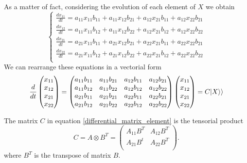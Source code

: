 As a matter of fact, considering the evolution of each element of $X$ we obtain
\begin{equation}
    \left\{\begin{aligned}
        \frac{dx_{11}}{dt} = a_{11}x_{11}b_{11} +a_{11}x_{12}b_{21}+ a_{12}x_{21}b_{11}+ a_{12}x_{22}b_{21}\\
        \frac{dx_{12}}{dt} = a_{11}x_{11}b_{12} +a_{11}x_{12}b_{22}+ a_{12}x_{21}b_{12}+ a_{12}x_{22}b_{22}\\
        \frac{dx_{21}}{dt} = a_{21}x_{11}b_{11} +a_{21}x_{12}b_{21}+ a_{22}x_{21}b_{11}+ a_{22}x_{22}b_{21}\\
        \frac{dx_{22}}{dt} = a_{21}x_{11}b_{12} +a_{21}x_{12}b_{22}+ a_{22}x_{21}b_{12}+ a_{22}x_{22}b_{22}\\
    \end{aligned}\right. 
\end{equation}
We can rearrange these equations     in a vectorial form
\begin{equation}\label{differential_matrix_element}
    \frac{d}{dt}\begin{pmatrix}
        x_{11}\\ x_{12}\\x_{21}\\ x_{22}\\
    \end{pmatrix} = \begin{pmatrix}
        a_{11}b_{11} &a_{11}b_{21}& a_{12}b_{11}& a_{12}b_{21}\\
        a_{11}b_{12} &a_{11}b_{22}& a_{12}b_{12}& a_{12}b_{22}\\
        a_{21}b_{11} &a_{21}b_{21}& a_{22}b_{11}& a_{22}b_{21}\\
        a_{21}b_{12} &a_{21}b_{22}& a_{22}b_{12}& a_{22}b_{22}\\
    \end{pmatrix}\begin{pmatrix}
        x_{11}\\ x_{12}\\ x_{21}\\ x_{22}\\
    \end{pmatrix} = C \lvert X\rangle\rangle
\end{equation}

The matrix $C$ in equation \eqref{differential_matrix_element} is the tensorial product
\begin{equation}
    C= A\otimes B^T = \begin{pmatrix}
        A_{11}B^T & A_{12}B^T\\
        A_{21}B^t& A_{22}B^T\\
    \end{pmatrix}.
\end{equation}
where $B^T$ is the transpose of matrix $B$.

